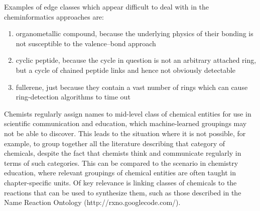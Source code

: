 \documentclass[10pt]{bmc_article}
\newenvironment{bmcformat}{\baselineskip20pt\sloppy\setboolean{publ}{false}}{\baselineskip20pt\sloppy}
\begin{document}
\begin{bmcformat}
Examples of edge classes which appear difficult to deal with in the cheminformatics approaches are:
\begin{enumerate}
  \item organometallic compound, because the underlying physics of their bonding is not susceptible to the valence--bond approach
	\item cyclic peptide, because the cycle in question is not an arbitrary attached ring, but a cycle of chained peptide links and hence not obviously detectable
	\item fullerene, just because they contain a vast number of rings which can cause ring-detection algorithms to time out
\end{enumerate}

Chemists regularly assign names to mid-level class of chemical entities for use in scientific communication and education, which machine-learned groupings may not be able to discover. This leads to the situation where it is not possible, for example, to group together all the literature describing that category of chemicals, despite the fact that chemists think and communicate regularly in terms of such categories.  This can be compared to the scenario in chemistry education, where relevant groupings of chemical entities are often taught in chapter-specific units. 
Of key relevance is linking classes of chemicals to the reactions that can be used to synthesize them, such as those described in the Name Reaction Ontology (http://rxno.googlecode.com/).


\end{bmcformat}
\end{document}
